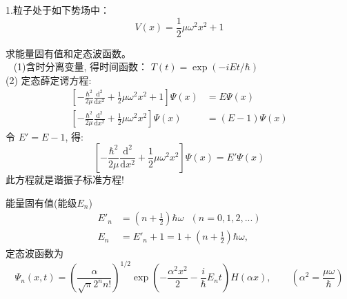 	{}
	\begin{example} {1.粒子处于如下势场中：}
	  \begin{equation*}
		  V(x)= \frac{1}{2} \mu \omega ^2 x^2  +1
	  \end{equation*}
	\end{example}
	  \hspace{2em}求能量固有值和定态波函数。\\	
	  {\解} ~ (1)含时分离变量, 得时间函数： $T(t)  = \exp(-i E t /\hbar) $ \\
	  (2) 定态薛定谔方程:
	  \begin{equation*}
		  \begin{split}
			  \left [ -\frac{\hbar^2}{2\mu} \frac{\mathrm{d} ^2}{\mathrm{d} x^2} +\frac{1}{2}\mu \omega^2 x^2 +1 \right ]\Psi(x)&=E\Psi(x) \\ 
			  \left [ -\frac{\hbar^2}{2\mu} \frac{\mathrm{d} ^2}{\mathrm{d} x^2} +\frac{1}{2}\mu \omega^2 x^2  \right ]\Psi(x)&=(E-1)\Psi(x) 	
		  \end{split}
	  \end{equation*}
	  令 $E'=E-1$, 得:
	  \[\left [ -\frac{\hbar^2}{2\mu} \frac{\mathrm{d} ^2}{\mathrm{d} x^2} +\frac{1}{2}\mu \omega^2 x^2  \right ]\Psi(x)=E'\Psi(x) \]
	  此方程就是谐振子标准方程!



		{}	  
	  能量固有值(能级$E_n$)
	  \[\begin{aligned}
		  E'_n&=\left(n+\frac{1}{2}\right) \hbar \omega ~~~  ( n=0,1,2, ...)  \\ 
		  E_n&= E'_n+1 = 1+ \left(n+\frac{1}{2}\right) \hbar \omega, 
	  \end{aligned} \] 
	  定态波函数为
	  \begin{equation*}
		  \Psi_n(x,t) = \left( \frac{\alpha}{\sqrt{\pi} 2^n n!}  \right) ^{1/2}  \exp(-\frac{ \alpha^2 x^2}{2} -\frac{i}{\hbar} E_n t ) H( \alpha x) , \qquad (\alpha ^2= \frac{\mu\omega}{\hbar}) 
	  \end{equation*}  

